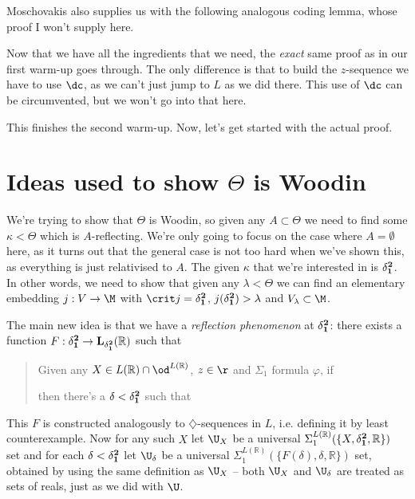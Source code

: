 Moschovakis also supplies us with the following analogous coding lemma, whose proof I won't supply here.


Now that we have all the ingredients that we need, the \textit{exact} same proof as in our first warm-up goes through. The only difference is that to build the $z$-sequence we have to use $\dc$, as we can't just jump to $L$ as we did there. This use of $\dc$ can be circumvented, but we won't go into that here.


This finishes the second warm-up. Now, let's get started with the actual proof.


\section{Ideas used to show $\Theta$ is Woodin}

We're trying to show that $\Theta$ is Woodin, so given any $A\subset\Theta$ we need to find some $\kappa<\Theta$ which is $A$-reflecting. We're only going to focus on the case where $A=\emptyset$ here, as it turns out that the general case is not too hard when we've shown this, as everything is just relativised to $A$. The given $\kappa$ that we're interested in is $\bf\delta^2_1$. In other words, we need to show that given any $\lambda<\Theta$ we can find an elementary embedding $j:V\to\M$ with $\crit j=\bf\delta^2_1$, $j(\bf\delta^2_1)>\lambda$ and $V_\lambda\subset\M$.

\qquad The main new idea is that we have a \textit{reflection phenomenon} at $\bf\delta^2_1$: there exists a function $F:\bf\delta^2_1\to L_{\bf\delta^2_1}(\mathbb R)$ such that

\begin{quotation}
	Given any $X\in L(\mathbb R)\cap\od^{L(\mathbb R)}$, $z\in\r$ and $\Sigma_1$ formula $\varphi$, if

	then there's a $\delta<\bf\delta^2_1$ such that
\end{quotation}

This $F$ is constructed analogously to $\diamondsuit$-sequences in $L$, i.e. defining it by least counterexample. Now for any such $X$ let $\U_X$ be a universal $\Sigma_1^{L(\mathbb R)}(\{X,\bf\delta^2_1,\mathbb R\})$ set and for each $\delta<\bf\delta^2_1$ let $\U_\delta$ be a universal $\Sigma_1^{L(\mathbb R)}(\{F(\delta),\delta,\mathbb R\})$ set, obtained by using the same definition as $\U_X$ -- both $\U_X$ and $\U_\delta$ are treated as sets of reals, just as we did with $\U$.

